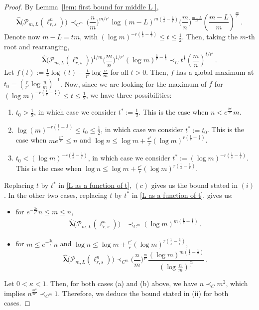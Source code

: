 \documentclass[12pt]{amsart}
\numberwithin{subsection}{section}
\theoremstyle{definition}
\theoremstyle{remark}
\begin{document}
\begin{proof}
By Lemma~\ref{lem: first bound for middle L },
\begin{equation*}
\widehat{\boldsymbol{\lambda}}\big(\mathcal P_{m,L}(\ell_{r,s}^n)\big) \,\prec_{C^m}
\, \Big(\frac{n}{m}\Big)^{m/r'} \log(m-L)^{m(\frac1{s}-\frac1{r})}
\Big(\frac{m}{n}\Big)^{\frac{m-L}{r'}}\left(\frac{m-L}{m}\right)^{\frac{m}{r}}\,.
\end{equation*}
Denote now  $m-L=tm$, with $(\log m)^{-r(\frac1{s}-\frac1{r})}\le t\le \frac12.$ Then, taking the $m$-th root and rearranging,
\begin{equation}\label{L as a function of t}
\widehat{\boldsymbol{\lambda}}\big(\mathcal P_{m,L}(\ell_{r,s}^n)\big)^{1/m}\Big(\frac{m}{n}\Big)^{1/r'}(\log m)^{\frac1{r}-\frac1{s}}
\prec_C t^{\frac1{r}}\left(\frac{m}{n}\right)^{t/r'}\,.
\end{equation}
Let $f(t):=\frac1{r}\log(t)-\frac{t}{r'}\log\frac{n}{m}$ for all $t>0$. Then, $f$ has a global maximum at
$t_0=\left(\frac{r}{r'}\log\frac{n}{m}\right)^{-1}$.  Now, since we are looking for the maximum of $f$ for
$(\log m)^{-r(\frac1{s}-\frac1{r})}\le t\le \frac12$, we have three possibilities:
\begin{enumerate}
\item[$(a)$] \label{case1} $t_0>\frac12$, in which case we  consider $t^*:=\frac{1}{2}$. This is the case when $n<e^{\frac{2r'}{r}}m$.
\item[$(b)$] \label{case3} $\log(m)^{-r(\frac1{s}-\frac1{r})} \le t_0 \le \frac{1}{2}$, in which case we  consider $t^*:=t_0$. This
is the case when $m e^{\frac{2r'}{r}}\le n$  and $\log n\le \log m +\frac{r'}{r}(\log m)^{r(\frac1{s}-\frac1{r})}$.
\item[$(c)$] \label{case2} $t_0<(\log m)^{-r(\frac1{s}-\frac1{r})}$, in which case we  consider $t^*:=(\log m)^{-r(\frac1{s}-\frac1{r})}$.
This is the case when $\log n\le \log m +\frac{r'}{r}(\log m)^{r(\frac1{s}-\frac1{r})}$.
\end{enumerate}
Replacing $t$ by $t^*$ in \eqref{L as a function of t},  $(c)$ gives us the bound stated in $(i)$. In the other two cases, replacing
$t$ by $t^*$ in \eqref{L as a function of t}, gives us:

\begin{itemize}
\item[$(a)$] for $e^{-\frac{2r}{r'}}n\le m\le n$,
\begin{align*}
\widehat{\boldsymbol{\lambda}}\big(\mathcal P_{m,L}(\ell_{r,s}^n)\big)   &\prec_{C^m}
(\log m)^{m(\frac1{s}-\frac1{r})}\,.
\end{align*}
\item[$(b)$] for $m\le e^{-\frac{2r}{r'}}n$ and $ \log n \le \log m + \frac{r'}{r}(\log m)^{r(\frac1{s}-\frac1{r})}$,
\[
\widehat{\boldsymbol{\lambda}}\big(\mathcal P_{m,L}(\ell_{r,s}^n)\big)
\prec_{C^m} \Big(\frac{n}{m}\Big)^{\frac{m}{r'}} \frac{\left(\log m\right)^{m(\frac1{s}-\frac1{r})}}{\left(\log \frac{n}{m}\right)^{\frac{m}{r}}}\,.
\]
\end{itemize}
Let $0 < \kappa < 1$. Then, for both cases (a) and (b) above, we have $n \prec_C m^2$, which implies $n^{\frac{m^\kappa}{2r'}} \prec_{C^m} 1$.
Therefore, we deduce the bound stated in (ii) for both cases.
\end{proof}
\end{document}
